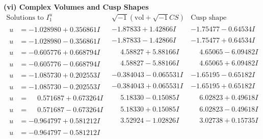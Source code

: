 \documentclass[1p]{elsarticle_modified}
\theoremstyle{definition}
\newcommand{\I}{\sqrt{-1}}
\begin{document}
\newpage\flushleft \textbf{(vi) Complex Volumes and Cusp Shapes}
$$\begin{array}{c|c|c}  
\text{Solutions to }I^u_{1}& \I (\text{vol} + \sqrt{-1}CS) & \text{Cusp shape}\\
 \hline 
\begin{aligned}
u &= -1.028980 + 0.356861 I\end{aligned}
 & -1.87833 + 1.42866 I & -1.75477 - 0.64534 I \\ \hline\begin{aligned}
u &= -1.028980 - 0.356861 I\end{aligned}
 & -1.87833 - 1.42866 I & -1.75477 + 0.64534 I \\ \hline\begin{aligned}
u &= -0.605776 + 0.668794 I\end{aligned}
 & \phantom{-}4.58827 + 5.88166 I & \phantom{-}4.65065 - 6.09482 I \\ \hline\begin{aligned}
u &= -0.605776 - 0.668794 I\end{aligned}
 & \phantom{-}4.58827 - 5.88166 I & \phantom{-}4.65065 + 6.09482 I \\ \hline\begin{aligned}
u &= -1.085730 + 0.202553 I\end{aligned}
 & -0.384043 - 0.065531 I & -1.65195 - 0.65182 I \\ \hline\begin{aligned}
u &= -1.085730 - 0.202553 I\end{aligned}
 & -0.384043 + 0.065531 I & -1.65195 + 0.65182 I \\ \hline\begin{aligned}
u &= \phantom{-}0.571687 + 0.673264 I\end{aligned}
 & \phantom{-}5.18330 - 0.15085 I & \phantom{-}6.02823 + 0.49618 I \\ \hline\begin{aligned}
u &= \phantom{-}0.571687 - 0.673264 I\end{aligned}
 & \phantom{-}5.18330 + 0.15085 I & \phantom{-}6.02823 - 0.49618 I \\ \hline\begin{aligned}
u &= -0.964797 + 0.581212 I\end{aligned}
 & \phantom{-}3.52924 - 1.02826 I & \phantom{-}3.02738 + 0.15735 I \\ \hline\begin{aligned}
u &= -0.964797 - 0.581212 I\end{aligned}

\end{array}$$
\end{document}
